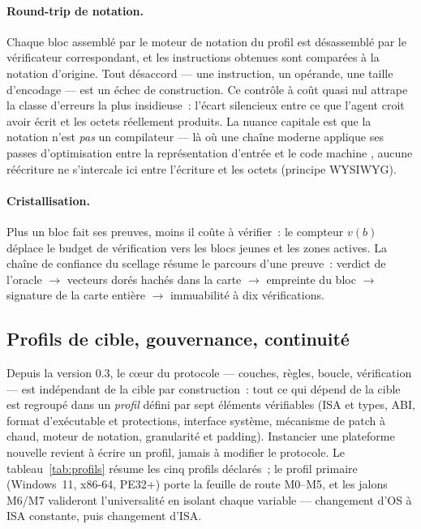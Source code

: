 \paragraph{Round-trip de notation.}
Chaque bloc assemblé par le moteur de notation du profil est désassemblé
par le vérificateur correspondant, et les instructions obtenues sont
comparées à la notation d’origine. Tout désaccord — une instruction, un
opérande, une taille d’encodage — est un échec de construction. Ce contrôle
à coût quasi nul attrape la classe d’erreurs la plus insidieuse~: l’écart
silencieux entre ce que l’agent croit avoir écrit et les octets réellement
produits. La nuance capitale est que la notation n’est \emph{pas} un
compilateur — là où une chaîne moderne applique ses passes d’optimisation
entre la représentation d’entrée et le code machine \cite{lattner2004},
aucune réécriture ne s’intercale ici entre l’écriture et les octets
(principe WYSIWYG).

\paragraph{Cristallisation.}
Plus un bloc fait ses preuves, moins il coûte à vérifier~: le compteur
$v(b)$ déplace le budget de vérification vers les blocs jeunes et les
zones actives. La chaîne de confiance du scellage résume le parcours d’une
preuve~: verdict de l’oracle $\to$ vecteurs dorés hachés dans la carte
$\to$ empreinte du bloc $\to$ signature de la carte entière $\to$
immuabilité à dix vérifications.

\subsection{Profils de cible, gouvernance, continuité}\label{sec:profils}

Depuis la version 0.3, le cœur du protocole — couches, règles, boucle,
vérification — est indépendant de la cible par construction~: tout ce qui
dépend de la cible est regroupé dans un \emph{profil} défini par sept
éléments vérifiables (ISA et types, ABI, format d’exécutable et
protections, interface système, mécanisme de patch à chaud, moteur de
notation, granularité et padding). Instancier une plateforme nouvelle
revient à écrire un profil, jamais à modifier le protocole. Le
tableau~\ref{tab:profils} résume les cinq profils déclarés~; le profil
primaire (Windows~11, x86-64, PE32+) porte la feuille de route M0–M5, et
les jalons M6/M7 valideront l’universalité en isolant chaque variable —
changement d’OS à ISA constante, puis changement d’ISA.

